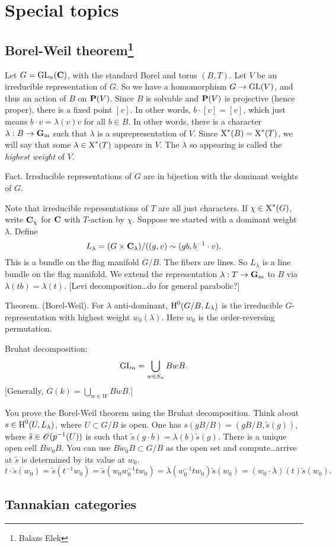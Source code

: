 
\section{Special topics}





\subsection[Borel-Weil theorem]{Borel-Weil theorem\footnote{Balazs Elek}}

Let $G=\operatorname{GL}_n(\mathbf{C})$, with the standard Borel and torus $(B,T)$. Let $V$ be an 
irreducible representation of $G$. So we have a homomorphism $G\to \operatorname{GL}(V)$, 
and thus an action of $B$ on $\mathbf{P}(V)$. Since $B$ is solvable and $\mathbf{P}(V)$ is 
projective (hence proper), there is a fixed point $[v]$. In other words, 
$b\cdot[v]=[v]$, which just means $b\cdot v=\lambda(v) v$ for all $b\in B$. 
In other words, there is a character $\lambda:B\to \mathbf{G}_\mathrm{m}$ such that 
$\lambda$ is a suprepresentation of $V$. Since 
$\operatorname{X}^\ast(B)=\operatorname{X}^\ast(T)$, we will say that some 
$\lambda\in \operatorname{X}^\ast(T)$ appears in $V$. The $\lambda$ so appearing 
is called the \emph{highest weight} of $V$. 

Fact. Irreducible representations of $G$ are in bijection with the 
dominant weights of $G$. 

Note that irreducible representations of $T$ are all just characters. If 
$\chi\in \operatorname{X}^\ast(G)$, write $\mathbf{C}_\chi$ for $\mathbf{C}$ with $T$-action 
by $\chi$. Suppose we started with a dominant weight $\lambda$. Define 
\[
  L_\lambda = (G\times \mathbf{C}_\lambda)/((g,v)\sim (g b,b^{-1}\cdot v) .
\]
This is a bundle on the flag manifold $G/B$. The fibers are lines. So 
$L_\lambda$ is a line bundle on the flag manifold. We extend the 
representation $\lambda:T\to \mathbf{G}_\mathrm{m}$ to $B$ via $\lambda(t b)=\lambda(t)$. 
[Levi decomposition\ldots do for general parabolic?] 

Theorem. (Borel-Weil). For $\lambda$ anti-dominant, 
$\operatorname{H}^0(G/B,L_\lambda)$ is the irreducible $G$-representation with highest 
weight $w_0(\lambda)$. Here $w_0$ is the order-reversing permutation. 

Bruhat decomposition: 
\[
  \operatorname{GL}_n = \bigcup_{w\in S_n} B w B .
\]
[Generally, $G(k)=\bigcup_{w\in W} B\dot w B$.]

You prove the Borel-Weil theorem using the Bruhat decomposition. Think about 
$s\in \operatorname{H}^0(U,L_\lambda)$, where $U\subset G/B$ is open. One has 
$s(g B/B)=(g B/B,\tilde s(g))$, where $\tilde s\in \mathscr{O}(p^{-1}(U))$ is such 
that $\tilde s(g\cdot b) = \lambda(b) \tilde s(g)$. There is a unique open 
cell $B \dot w_0 B$. You can use $B \dot w_0 B\subset G/B$ as the open set 
and compute\ldots arrive at $\tilde s$ is determined by its value at 
$w_0$. 
\[
  t\cdot \tilde s(w_0)=\tilde s(t^{-1} w_0) = \tilde s(w_0 w_0^{-1} t w_0) = \lambda(w_0^{-1} t w_0) \tilde s(w_0) = (w_0\cdot \lambda)(t)\tilde s(w_0) .
\]




\subsection{Tannakian categories}

